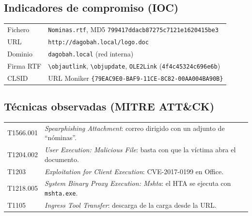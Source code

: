 \documentclass[11pt,a4paper]{article}
\newcommand{\bs}{\textbackslash\allowbreak{}}
\begin{document}
\subsection{Indicadores de compromiso (IOC)}
\begin{tabularx}{\linewidth}{@{}lX@{}}
\toprule
Fichero & \texttt{Nominas.rtf}, MD5 \texttt{799417ddacb87275c7121e1620415be3} \\
URL & \texttt{http://dagobah.local/logo.doc} \\
Dominio & \texttt{dagobah.local} (red interna) \\
Firma RTF & \texttt{\bs objautlink}, \texttt{\bs objupdate}, \texttt{OLE2Link} (\texttt{4f4c45324c696e6b}) \\
CLSID & URL Moniker \texttt{\{79EAC9E0-\allowbreak BAF9-\allowbreak 11CE-\allowbreak 8C82-\allowbreak 00AA004BA90B\}} \\
\bottomrule
\end{tabularx}

\subsection{Técnicas observadas (MITRE ATT\&CK)}
\begin{tabularx}{\linewidth}{@{}lX@{}}
\toprule
T1566.001 & \emph{Spearphishing Attachment}: correo dirigido con un adjunto de ``nóminas''. \\
T1204.002 & \emph{User Execution: Malicious File}: basta con que la víctima abra el documento. \\
T1203 & \emph{Exploitation for Client Execution}: CVE-2017-0199 en Office. \\
T1218.005 & \emph{System Binary Proxy Execution: Mshta}: el HTA se ejecuta con \texttt{mshta.exe}. \\
T1105 & \emph{Ingress Tool Transfer}: descarga de la carga desde la URL. \\
\bottomrule
\end{tabularx}
\end{document}
